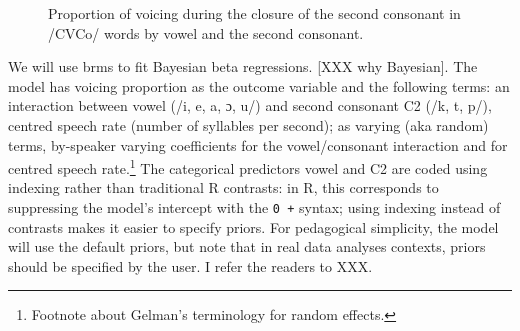 \documentclass[
  authoryear,
  preprint,
  3p]{elsarticle}
\begin{document}
\begin{figure}


\caption{\label{fig-ita-egg}Proportion of voicing during the closure of
the second consonant in /CVCo/ words by vowel and the second consonant.}

\end{figure}%

We will use brms to fit Bayesian beta regressions. {[}XXX why
Bayesian{]}. The model has voicing proportion as the outcome variable
and the following terms: an interaction between vowel (/i, e, a, ɔ, u/)
and second consonant C2 (/k, t, p/), centred speech rate (number of
syllables per second); as varying (aka random) terms, by-speaker varying
coefficients for the vowel/consonant interaction and for centred speech
rate.\footnote{Footnote about Gelman's terminology for random effects.}
The categorical predictors vowel and C2 are coded using indexing rather
than traditional R contrasts: in R, this corresponds to suppressing the
model's intercept with the \texttt{0\ +} syntax; using indexing instead
of contrasts makes it easier to specify priors. For pedagogical
simplicity, the model will use the default priors, but note that in real
data analyses contexts, priors should be specified by the user. I refer
the readers to XXX.
\end{document}
